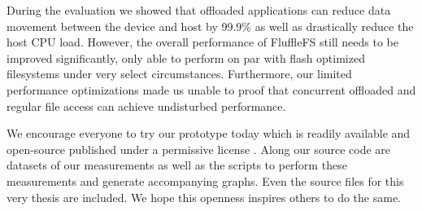 During the evaluation we showed that offloaded applications can reduce
data movement between the device and host by 99.9\% as well as drastically
reduce the host CPU load. However, the overall performance of FluffleFS still
needs to be improved significantly, only able to perform on par with flash
optimized filesystems under very select circumstances. Furthermore, our
limited performance optimizations made us unable to proof that concurrent
offloaded and regular file access can achieve undisturbed performance.

We encourage everyone to try our prototype today which is readily available
and open-source published under a permissive license \cite{qemu-csd}. Along our
source code are datasets of our measurements as well as the scripts to perform
these measurements and generate accompanying graphs. Even the source files for
this very thesis are included. We hope this openness inspires others to do the
same.

